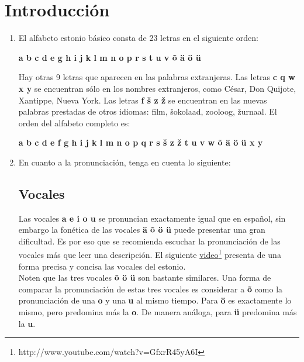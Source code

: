 \section{Introducción}

\begin{enumerate}
	\item El alfabeto estonio básico consta de 23 letras en el siguiente orden:
	\begin{center}
	\begin{otherlanguage}{estonian}
		\textbf{a b c d e g h i j k l m n o p r s t u v õ ä ö ü}
	\end{otherlanguage}
	\end{center}

	Hay otras 9 letras que aparecen en las palabras extranjeras. Las letras \textbf{c q w x y} se encuentran sólo en los nombres extranjeros, como César, Don Quijote, Xantippe, Nueva York. Las letras \foreignlanguage{estonian}{\textbf{f š z ž}} se encuentran en las nuevas palabras prestadas de otros idiomas: \foreignlanguage{estonian}{film, šokolaad, zooloog, žurnaal}. El orden del alfabeto completo es:
	\begin{center}
	\begin{otherlanguage}{estonian}
		\textbf{a b c d e f g h i j k l m n o p q r s š z ž t u v w õ ä ö ü x y}
	\end{otherlanguage}
	\end{center}

	\item En cuanto a la pronunciación, tenga en cuenta lo siguiente:

	\subsection*{Vocales}

	Las vocales \textbf{a e i o u} se pronuncian exactamente igual que en español, sin embargo la fonética de las vocales \foreignlanguage{estonian}{\textbf{ä õ ö ü}} puede presentar una gran dificultad. Es por eso que se recomienda escuchar la pronunciación de las vocales más que leer una descripción. El siguiente \href{http://www.youtube.com/watch?v=GfxrR45yA6I}{video}\footnote{http://www.youtube.com/watch?v=GfxrR45yA6I} presenta de una forma precisa y concisa las vocales del estonio.\\

	Noten que las tres vocales \foreignlanguage{estonian}{\textbf{õ ö ü}} son bastante similares. Una forma de comparar la pronunciación de estas tres vocales es considerar a \foreignlanguage{estonian}{\textbf{õ}} como la pronunciación de una \textbf{o} y una \textbf{u} al mismo tiempo. Para \foreignlanguage{estonian}{\textbf{ö}} es exactamente lo mismo, pero predomina más la \textbf{o}. De manera análoga, para \foreignlanguage{estonian}{\textbf{ü}} predomina más la \textbf{u}.\\


\end{enumerate}

